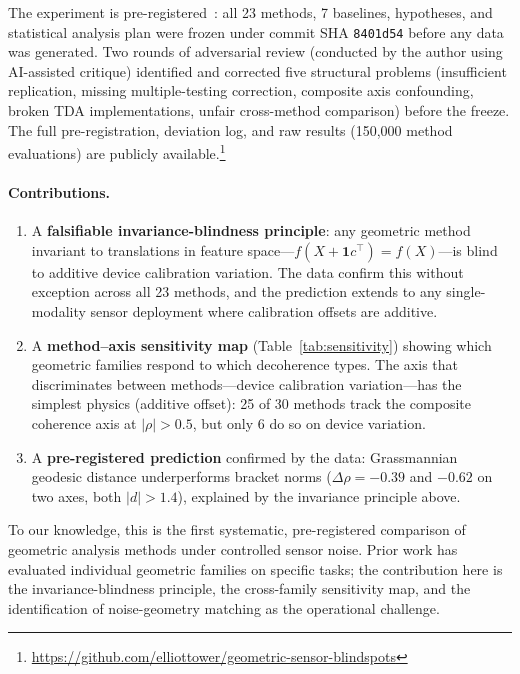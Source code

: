 \documentclass[11pt]{article}
\begin{document}
The experiment is
pre-registered~\citep{nosek2018preregistration,simmons2011false}: all
23 methods, 7 baselines, hypotheses, and statistical analysis plan were
frozen under commit SHA
\texttt{8401d54} before any data was generated.  Two rounds of
adversarial review (conducted by the author using AI-assisted critique)
identified and corrected five structural problems (insufficient
replication, missing multiple-testing correction, composite axis
confounding, broken TDA implementations, unfair cross-method comparison)
before the freeze.  The full pre-registration, deviation
log, and raw results (150,000 method evaluations) are publicly
available.\footnote{\url{https://github.com/elliottower/geometric-sensor-blindspots}}

\paragraph{Contributions.}
\begin{enumerate}
  \item A \textbf{falsifiable invariance-blindness principle}: any
    geometric method invariant to translations in feature space---$f(X +
    \mathbf{1}c^\top) = f(X)$---is blind to additive device calibration
    variation.  The data confirm this without exception across all 23
    methods, and the prediction extends to any single-modality sensor
    deployment where calibration offsets are additive.
  \item A \textbf{method--axis sensitivity map} (Table~\ref{tab:sensitivity})
    showing which geometric families respond to which decoherence types.
    The axis that discriminates between methods---device calibration
    variation---has the simplest physics (additive offset): 25 of 30
    methods track the composite coherence axis at $|\rho| > 0.5$, but
    only 6 do so on device variation.
  \item A \textbf{pre-registered prediction} confirmed by the data:
    Grassmannian geodesic distance underperforms bracket norms
    ($\Delta\rho = -0.39$ and $-0.62$ on two axes, both $|d| > 1.4$),
    explained by the invariance principle above.
\end{enumerate}

To our knowledge, this is the first systematic, pre-registered
comparison of geometric analysis methods under controlled sensor noise.
Prior work has evaluated individual geometric families on specific
tasks; the contribution here is the invariance-blindness principle, the
cross-family sensitivity map, and the identification of noise-geometry
matching as the operational challenge.
\end{document}
